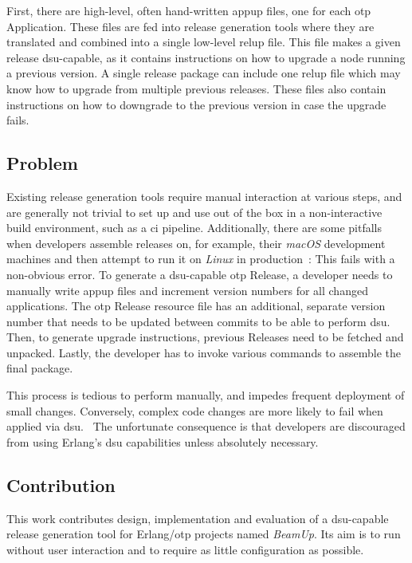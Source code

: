 First, there are high-level, often hand-written \acrfull{appup} files, one for each \acrshort{otp} Application. These files are fed into release generation tools where they are translated and combined into a single low-level \acrshort{relup} file.\cite{doc:otp} This file makes a given release \acrshort{dsu}-capable, as it contains instructions on how to upgrade a node running a previous version. A single release package can include one \acrshort{relup} file which may know how to upgrade from multiple previous releases. These files also contain instructions on how to downgrade to the previous version in case the upgrade fails.

\subsection{Problem}\label{sec:problem} Existing release generation tools require manual interaction at various steps, and are generally not trivial to set up and use out of the box in a non-interactive build environment, such as a \acrfull{ci} pipeline. Additionally, there are some pitfalls when developers assemble releases on, for example, their \emph{macOS} development machines and then attempt to run it on \emph{Linux} in production~\cite{cesarini:otp}: This fails with a non-obvious error. To generate a \acrshort{dsu}-capable \acrshort{otp} Release, a developer needs to manually write \acrshort{appup} files and increment version numbers for all changed applications. The \acrshort{otp} Release resource file has an additional, separate version number that needs to be updated between commits to be able to perform \acrshort{dsu}. Then, to generate upgrade instructions, previous Releases need to be fetched and unpacked. Lastly, the developer has to invoke various commands to assemble the final package.~\cite{ferd}

This process is tedious to perform manually, and impedes frequent deployment of small changes. Conversely, complex code changes are more likely to fail when applied via \acrshort{dsu}.~\cite{hicks} The unfortunate consequence is that developers are discouraged from using Erlang's \acrshort{dsu} capabilities unless absolutely necessary.~\cite{ferd}

\subsection{Contribution}

This work contributes design, implementation and evaluation of a \acrshort{dsu}-capable release generation tool for Erlang/\acrshort{otp} projects named \emph{BeamUp}. Its aim is to run without user interaction and to require as little configuration as possible.

